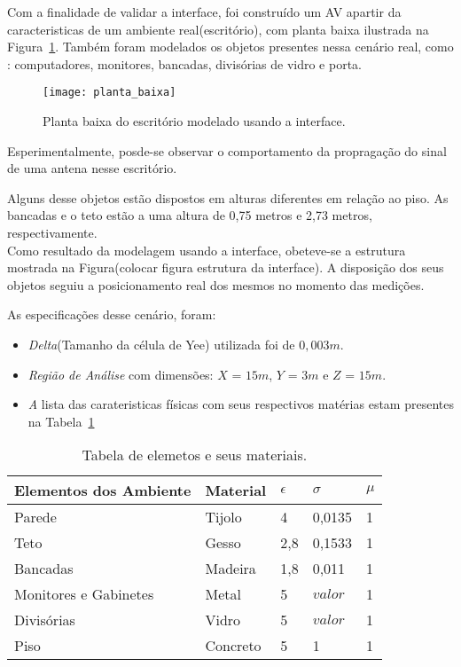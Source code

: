 Com a finalidade de validar a interface, foi construído um AV apartir da caracteristicas de um ambiente real(escritório), com planta baixa ilustrada na Figura~\ref{fg:planta_baixa}. Também foram modelados os objetos presentes nessa cenário real, como : computadores, monitores, bancadas, divisórias de vidro e porta.\\

\begin{figure}[ht!]
	\centering
	\texttt{[image: planta\_baixa]}
	\caption{Planta baixa do escritório modelado usando a interface.}
	\label{fg:planta_baixa}
\end{figure}

Esperimentalmente, posde-se observar o comportamento da propragação do sinal de uma antena nesse escritório. 

Alguns desse objetos estão dispostos em alturas diferentes em relação ao piso. As bancadas e o teto estão a uma altura de 0,75 metros e 2,73 metros, respectivamente.\\

Como resultado da modelagem usando a interface, obeteve-se a estrutura mostrada na Figura(colocar figura estrutura da interface). A disposição dos seus objetos seguiu a posicionamento real dos mesmos no momento das medições.

As especificações desse cenário, foram:
\begin{itemize}
\item \textit{Delta}(Tamanho da célula de Yee) utilizada foi de $0,003m$.
\item \textit{Região de Análise} com dimensões: $X$ = $15m$, $Y$ = $3m$ e $Z$ = $15m$.
\item \textit A lista das carateristicas físicas com seus respectivos matérias estam presentes na Tabela~\ref{tab:materiais}
\end{itemize}

\begin{table}
\centering
	\begin{tabular}{|l|l|l|l|l|}
	\hline
	Elementos dos Ambiente & Material & $\epsilon$ & $\sigma$ & $\mu$ \\ \hline
	Parede & Tijolo & 4 & 0,0135 & 1\\ \hline
	Teto & Gesso & 2,8 & 0,1533 & 1 \\ \hline
	Bancadas & Madeira & 1,8 & 0,011 & 1\\ \hline
	Monitores e Gabinetes & Metal & 5 & $valor$ & 1\\ \hline
	Divisórias & Vidro & 5 & $valor$ & 1 \\ \hline
	Piso & Concreto & 5 & 1 & 1 \\
	\hline
	\end{tabular}
	\caption{Tabela de elemetos e seus materiais.}
	\label{tab:materiais}	
\end{table}


